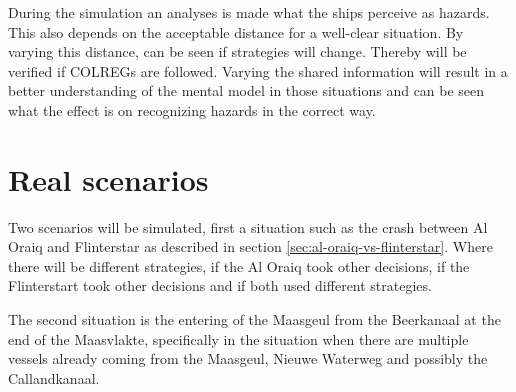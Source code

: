 During the simulation an analyses is made what the ships perceive as hazards. This also depends on the acceptable distance for a well-clear situation. By varying this distance, can be seen if strategies will change. 
Thereby will be verified if \ac{COLREGs} are followed.
Varying the shared information will result in a better understanding of the mental model in those situations and can be seen what the effect is on recognizing hazards in the correct way.

\section{Real scenarios}
Two scenarios will be simulated, first a situation such as the crash between Al Oraiq and Flinterstar as described in section \ref{sec:al-oraiq-vs-flinterstar}. Where there will be different strategies, if the Al Oraiq took other decisions, if the Flinterstart took other decisions and if both used different strategies. 

The second situation is the entering of the Maasgeul from the Beerkanaal at the end of the Maasvlakte, specifically in the situation when there are multiple vessels already coming from the Maasgeul, Nieuwe Waterweg and possibly the Callandkanaal.

